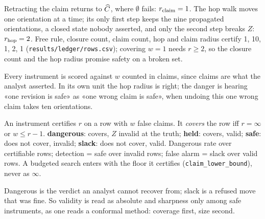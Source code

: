 \begin{exemplo}
Retracting the claim returns to $\widehat{C}$, where $\emptyset$ fails: $r_{\mathrm{claim}} = 1$. The hop walk moves one
orientation at a time; its only first step keeps the nine propagated orientations, a closed state
nobody asserted, and only the second step breaks $Z$: $r_{\mathrm{hop}} = 2$. Free rule, closure count, claim
count,
hop and claim radius certify 1, 10, 1, 2, 1 (\texttt{results/ledger/rows.csv}); covering $w = 1$ needs
$r \ge 2$, so the closure count and the hop radius promise safety on a broken set.
\end{exemplo}

Every instrument is scored against $w$ counted in claims, since claims are what the analyst asserted.
In its own unit the hop radius is right; the danger is hearing «one revision is safe» as «one wrong
claim is safe», when undoing this one wrong claim takes ten orientations.

\begin{formulabox}
An instrument certifies $r$ on a row with $w$ false claims. It \emph{covers} the row iff $r = \infty$ or
$w \le r-1$. \textbf{dangerous}: covers, $Z$ invalid at the truth; \textbf{held}: covers, valid;
\textbf{safe}: does not cover, invalid; \textbf{slack}: does not cover, valid. Dangerous rate over
certifiable rows; detection = safe over invalid rows; false alarm = slack over valid rows. A budgeted
search enters with the floor it certifies (\texttt{claim\_lower\_bound}), never as $\infty$.
\end{formulabox}

Dangerous is the verdict an analyst cannot recover from; slack is a refused move that was fine. So
validity is read as absolute and sharpness only among safe instruments, as one reads a conformal
method: coverage first, size second.


